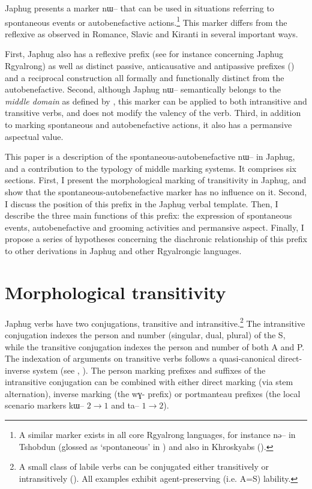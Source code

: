 \documentclass[oldfontcommands,oneside,a4paper,11pt]{article}
\newcommand{\ipa}[1]{{\phon \mbox{#1}}} %
\begin{document}
Japhug presents a marker \ipa{nɯ--} that can be used in situations referring to  spontaneous events or autobenefactive actions.\footnote{A similar marker exists in all core Rgyalrong languages, for instance \ipa{nə--} in Tshobdun (glossed as `spontaneous' in \citealt[634]{jackson14morpho}) and also in Khroskyabs (\citealt[157-160]{lai13affixale}).} This marker differs from the reflexive as observed in Romance, Slavic and Kiranti in several important ways.

First, Japhug also has a  reflexive prefix (see for instance \citealt{jacques10refl} concerning Japhug Rgyalrong) as well as distinct passive, anticausative and antipassive prefixes (\citealt{jacques12demotion}) and a reciprocal construction all formally and functionally distinct from the autobenefactive. Second, although Japhug  \ipa{nɯ--}  semantically belongs to the \textit{middle domain} as defined by \citet[15]{kemmer93middle}, this marker can be applied to both intransitive and transitive verbs,  and does not modify the valency of the verb.  Third, in addition to marking spontaneous and autobenefactive actions, it also has a permansive aspectual value.
 
 
 This paper is a description of the spontaneous-autobenefactive  \ipa{nɯ--}  in Japhug, and a contribution to the typology of middle marking systems. It comprises six sections. First, I present the morphological marking  of transitivity in Japhug, and show that the spontaneous-autobenefactive marker has no influence on it. Second, I discuss the position of this prefix  in the Japhug verbal template. Then, I describe the three main functions of this prefix: the expression of spontaneous events, autobenefactive and grooming activities and  permansive aspect. Finally, I propose a series of hypotheses concerning the diachronic relationship of this prefix to other derivations in Japhug and other Rgyalrongic languages. 
 

\section{Morphological transitivity}

Japhug verbs have two conjugations, transitive and intransitive.\footnote{A  small class of labile verbs can be conjugated either transitively or intransitively (\citealt{jacques12demotion}). All examples exhibit agent-preserving  (i.e. A=S) lability.} The intransitive conjugation indexes the person and number (singular, dual, plural) of the S, while the transitive conjugation indexes the person and number of both A and P. The indexation of arguments on transitive verbs follows a quasi-canonical direct-inverse system (see \citealt{delancey81direction, jackson02rentongdengdi, jacques10inverse}, \citealt{jacques14inverse, gongxun14agreement}). The person marking prefixes and suffixes of the intransitive conjugation can be combined with either direct marking (via stem alternation), inverse marking (the \ipa{wɣ-} prefix) or portmanteau prefixes (the local scenario markers \ipa{kɯ--} $2\rightarrow1$ and \ipa{ta--} $1\rightarrow2$).
\end{document}
